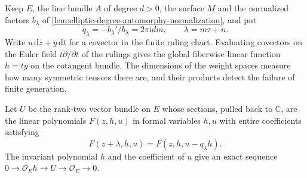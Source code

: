 Keep $E$, the line bundle $A$ of degree $d>0$, the surface $M$ and the normalized factors $b_\lambda$ of \cref{lem:elliptic-degree-automorphy-normalization}, and put
\[
 q_\lambda=-b_\lambda'/b_\lambda=2\pi\mathrm{i}dm,
 \qquad \lambda=m\tau+n.
\]
Write $u\,\mathrm{d}z+y\,\mathrm{d}t$ for a covector in the finite ruling chart. Evaluating covectors on the Euler field $t\partial/\partial t$ of the rulings gives the global fiberwise linear function $h=ty$ on the cotangent bundle. The dimensions of the weight spaces measure how many symmetric tensors there are, and their products detect the failure of finite generation.

Let $U$ be the rank-two vector bundle on $E$ whose sections, pulled back to $\mathbb C$, are the linear polynomials $F(z,h,u)$ in formal variables $h,u$ with entire coefficients satisfying
\[
 F(z+\lambda,h,u)=F(z,h,u-q_\lambda h).
\]
The invariant polynomial $h$ and the coefficient of $u$ give an exact sequence $0\to\mathcal O_Eh\to U\to\mathcal O_E\to0$.

